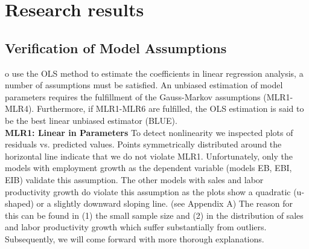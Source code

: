 %
%
\let\textcircled=\pgftextcircled
\chapter{Research results}
\label{chap:intro}

\section{Verification of Model Assumptions}
o use the OLS method to estimate the coefficients in linear regression analysis, a number of assumptions must be satisfied. An unbiased estimation of model parameters requires the fulfillment of the Gauss-Markov assumptions (MLR1-MLR4). Furthermore, if MLR1-MLR6 are fulfilled, the OLS estimation is said to be the best linear unbiased estimator (BLUE). 
\\

\textbf{MLR1: Linear in Parameters
}
To detect nonlinearity we inspected plots of residuals vs. predicted values. Points symmetrically distributed around the horizontal line indicate that we do not violate MLR1.
Unfortunately, only the models with employment growth as the dependent variable (models EB, EBI, EIB) validate this assumption. The other models with sales and labor productivity growth do violate this assumption as the plots show a quadratic (u-shaped) or a slightly downward sloping line. (see Appendix A) The reason for this can be found in (1) the small sample size and (2) in the distribution of sales and labor productivity growth which suffer substantially from outliers. Subsequently, we will come forward with more thorough explanations.    \\

